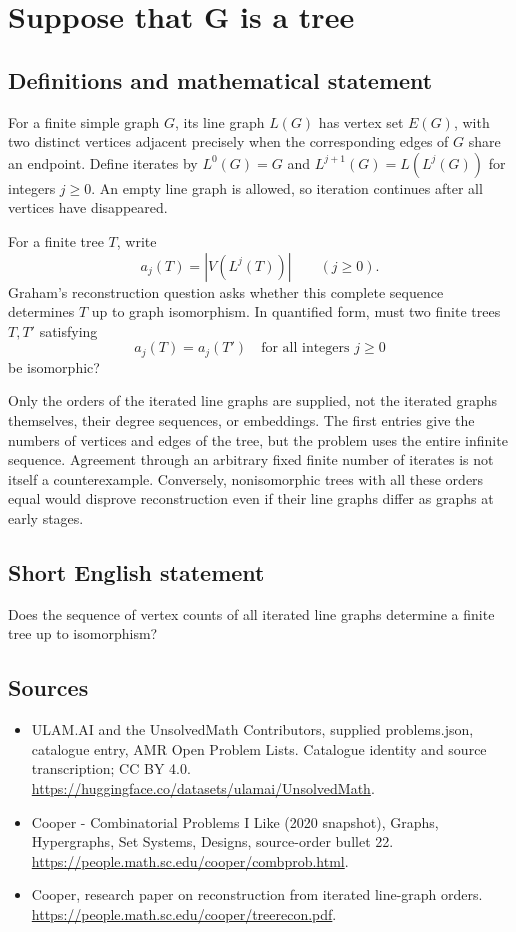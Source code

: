 \documentclass[11pt,a4paper]{article}
\begin{document}
\section*{Suppose that G is a tree}\label{statement}

\subsection{Definitions and mathematical statement}
For a finite simple graph $G$, its line graph $L(G)$ has vertex set
$E(G)$, with two distinct vertices adjacent precisely when the
corresponding edges of $G$ share an endpoint. Define iterates by
$L^0(G)=G$ and $L^{j+1}(G)=L(L^j(G))$ for integers $j\ge0$.
An empty line graph is allowed, so iteration continues after all
vertices have disappeared.

For a finite tree $T$, write
\[
                     a_j(T)=|V(L^j(T))|\qquad(j\ge0).
\]
Graham's reconstruction question asks whether this complete
sequence determines $T$ up to graph isomorphism. In quantified
form, must two finite trees $T,T'$ satisfying
\[
              a_j(T)=a_j(T')\quad\text{for all integers }j\ge0
\]
be isomorphic?

Only the orders of the iterated line graphs are supplied, not the
iterated graphs themselves, their degree sequences, or embeddings.
The first entries give the numbers of vertices and edges of the
tree, but the problem uses the entire infinite sequence. Agreement
through an arbitrary fixed finite number of iterates is not itself
a counterexample. Conversely, nonisomorphic trees with all these
orders equal would disprove reconstruction even if their line
graphs differ as graphs at early stages.
\subsection{Short English statement}
Does the sequence of vertex counts of all iterated line graphs determine a finite tree up to isomorphism?
\subsection{Sources}
\begin{itemize}
\item[S1] ULAM.AI and the UnsolvedMath Contributors, supplied problems.json, catalogue entry, AMR Open Problem Lists. Catalogue identity and source transcription; CC BY 4.0.
\url{https://huggingface.co/datasets/ulamai/UnsolvedMath}.
\item[S2] Cooper - Combinatorial Problems I Like (2020 snapshot), Graphs, Hypergraphs, Set Systems, Designs, source-order bullet 22. 
\url{https://people.math.sc.edu/cooper/combprob.html}.
\item[S3] Cooper, research paper on reconstruction from iterated line-graph orders.
\url{https://people.math.sc.edu/cooper/treerecon.pdf}.
\end{itemize}
\end{document}
